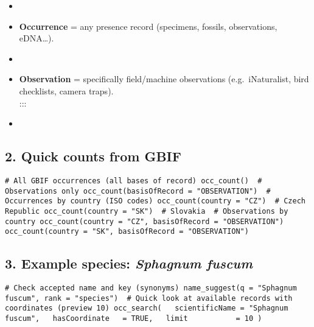 \documentclass[
  letterpaper,
  DIV=11,
  numbers=noendperiod]{scrartcl}
\begin{document}
\begin{tcolorbox}[enhanced jigsaw, bottomtitle=1mm, bottomrule=.15mm, opacitybacktitle=0.6, left=2mm, colframe=quarto-callout-tip-color-frame, colbacktitle=quarto-callout-tip-color!10!white, title=\textcolor{quarto-callout-tip-color}{\faLightbulb}\hspace{0.5em}{Tip: Occurrence vs Observation}, rightrule=.15mm, opacityback=0, colback=white, titlerule=0mm, toptitle=1mm, toprule=.15mm, arc=.35mm, leftrule=.75mm, breakable, coltitle=black]

\begin{itemize}
\item
\item
  \textbf{Occurrence} = any presence record (specimens, fossils,
  observations, eDNA\ldots).
\item
\item
  \textbf{Observation} = specifically field/machine observations
  (e.g.~iNaturalist, bird checklists, camera traps).\\

  :::
\item
\end{itemize}

\subsection{2. Quick counts from GBIF}\label{quick-counts-from-gbif}

\begin{verbatim}
# All GBIF occurrences (all bases of record) occ_count()  # Observations only occ_count(basisOfRecord = "OBSERVATION")  # Occurrences by country (ISO codes) occ_count(country = "CZ")  # Czech Republic occ_count(country = "SK")  # Slovakia  # Observations by country occ_count(country = "CZ", basisOfRecord = "OBSERVATION") occ_count(country = "SK", basisOfRecord = "OBSERVATION") 
\end{verbatim}

\subsection{\texorpdfstring{3. Example species: \emph{Sphagnum
fuscum}}{3. Example species: Sphagnum fuscum}}\label{example-species-sphagnum-fuscum}

\begin{verbatim}
# Check accepted name and key (synonyms) name_suggest(q = "Sphagnum fuscum", rank = "species")  # Quick look at available records with coordinates (preview 10) occ_search(   scientificName = "Sphagnum fuscum",   hasCoordinate   = TRUE,   limit           = 10 ) 
\end{verbatim}


\end{tcolorbox}
\end{document}
